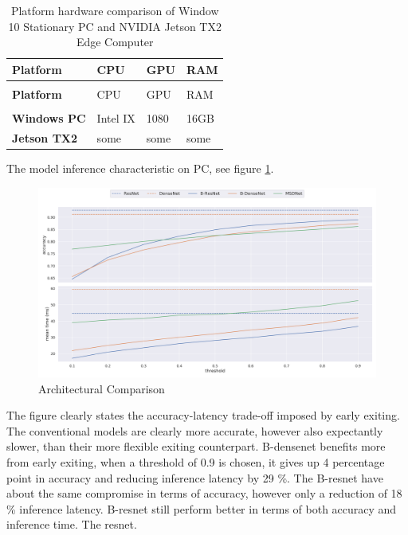 \begin{longtabu}{>{\bfseries}X|X|X|X}
	\caption[Platform hardware comparison]{Platform hardware comparison of Window 10 Stationary PC and NVIDIA Jetson TX2 Edge Computer} \label{tbl:platforms} \\
	\toprule
	\rowfont{\bfseries}
	Platform & CPU & GPU & RAM  \tabularnewline
	\bottomrule
	\endfirsthead
	\\
	\toprule
	\rowfont{\bfseries}
	Platform & CPU & GPU & RAM  \tabularnewline
	\bottomrule
	\endhead %
	\bottomrule
	\\
	\endfoot
	\hline
	\endlastfoot
	Windows PC & Intel IX & 1080 & 16GB \tabularnewline
	\hline
	Jetson TX2 & some & some & some \tabularnewline
	\bottomrule
\end{longtabu}

The model inference characteristic on PC, see figure \ref{fig:early_exit_vs_conv}.

  \begin{figure}
  	\captionsetup[subfigure]{justification=centering}
  	\centering
  	\includegraphics[width=\linewidth]{figures/threshold_plots/compare_exiting_vs_no_exiting}
  	\caption[Architectural Comparison]{Architectural Comparison}
  	\label{fig:early_exit_vs_conv}
  \end{figure}

The figure clearly states the accuracy-latency trade-off imposed by early exiting. The conventional models are clearly more accurate, however also expectantly slower, than their more flexible exiting counterpart. B-\gls{densenet} benefits more from early exiting, when a threshold of 0.9 is chosen, it gives up 4 percentage point in accuracy and reducing inference latency by 29 \%. The B-\gls{resnet} have about the same compromise in terms of accuracy, however only a reduction of 18 \% inference latency. B-\gls{resnet} still perform better in terms of both accuracy and inference time. The \gls{resnet}. 

